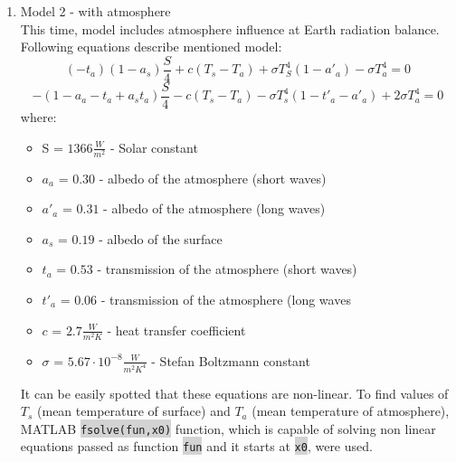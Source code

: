 \documentclass[onecolumn]{article}
\newcommand{\inline}[1]{\colorbox{lightgray}{\lstinline[basicstyle=\ttfamily\color{brown}]|#1|}}
\begin{document}
\begin{enumerate}
\begin{lstlisting}[language=Matlab,frame=single,label={lst:autocorr},breaklines=true,caption={Mean Earth temperature without atmosphere calculation script}]
];
disp(output);
      \end{lstlisting}
      Its execution results in:
      \begin{lstlisting}[language=Matlab,frame=single,label={lst:autocorr},breaklines=true,caption={Mean Earth temperature without atmosphere calculation script execution}]
>> mean_temp
Mean earth temperature without atmosphere in:
  Kelvins: 254.8158 K
  Celcius: -18.3342 deg of C
      \end{lstlisting}
    \newpage
    \item Model 2 - with atmosphere \\
      This time, model includes atmosphere influence at Earth radiation balance. Following equations describe mentioned model:
      \begin{equation}
      	(-t_a)(1-a_s)\frac{S}{4} + c(T_s - T_a) + \sigma T_S^4 (1-a'_a) - \sigma T_a^4 = 0
      \end{equation}
      \begin{equation}
      	-(1 - a_a - t_a + a_s t_a) \frac{S}{4} - c(T_s - T_a) - \sigma T_s^4 (1 - t'_a - a'_a) + 2 \sigma T_a^4 = 0
      \end{equation}
      where:
      \begin{itemize}
          \item S = $1366 \frac{W}{m^2}$ - Solar constant
          \item $a_a$ = $0.30$ - albedo of the atmosphere (short waves)
          \item $a'_a$ = $0.31$ - albedo of the atmosphere (long waves)
          \item $a_s$ = $0.19$ - albedo of the surface
          \item $t_a$ = $0.53$ - transmission of the atmosphere (short waves)
          \item $t'_a$ = $0.06$ - transmission of the atmosphere (long waves
          \item $c$ = $2.7 \frac{W}{m^2K}$ - heat transfer coefficient
          \item $\sigma$ = $5.67 \cdot 10^{-8} \frac{W}{m^2K^4}$ - Stefan Boltzmann constant
      \end{itemize}
      It can be easily spotted that these equations are non-linear. To find values of $T_s$ (mean temperature of surface) and $T_a$ (mean temperature of atmosphere), MATLAB \inline{fsolve(fun,x0)} function, which is capable of solving non linear equations passed as function \inline{fun} and it starts at \inline{x0}, were used. \\

\end{enumerate}
\end{document}
